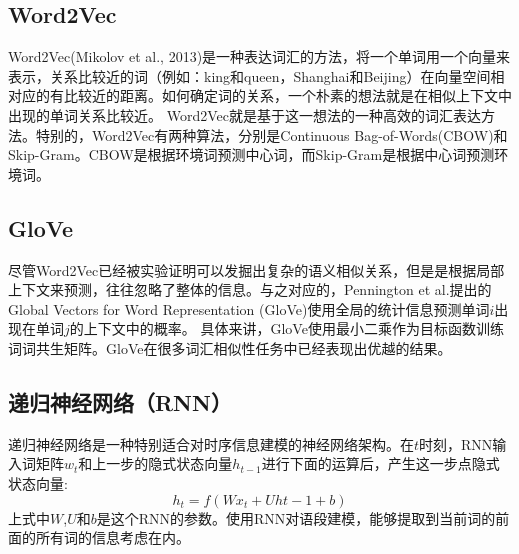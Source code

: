 \subsection{Word2Vec}
Word2Vec(Mikolov et al., 2013\cite{mikolov2013efficient})是一种表达词汇的方法，将一个单词用一个向量来表示，关系比较近的词（例如：king和queen，Shanghai和Beijing）在向量空间相对应的有比较近的距离。如何确定词的关系，一个朴素的想法就是在相似上下文中出现的单词关系比较近。
Word2Vec就是基于这一想法的一种高效的词汇表达方法。特别的，Word2Vec有两种算法，分别是Continuous Bag-of-Words(CBOW)和Skip-Gram。CBOW是根据环境词预测中心词，而Skip-Gram是根据中心词预测环境词。\\
\subsection{GloVe}
尽管Word2Vec已经被实验证明可以发掘出复杂的语义相似关系，但是是根据局部上下文来预测，往往忽略了整体的信息。与之对应的，Pennington et al.\cite{pennington2014glove}提出的Global Vectors for Word Representation (GloVe)使用全局的统计信息预测单词$i$出现在单词$j$的上下文中的概率。
具体来讲，GloVe使用最小二乘作为目标函数训练词词共生矩阵。GloVe在很多词汇相似性任务中已经表现出优越的结果。\\
\subsection{递归神经网络（RNN）}
递归神经网络是一种特别适合对时序信息建模的神经网络架构。在$t$时刻，RNN输入词矩阵$w_t$和上一步的隐式状态向量$h_{t-1}$进行下面的运算后，产生这一步点隐式状态向量:\\
\begin{equation}
h_t = f(Wx_t+Uh{t-1}+b)
\end{equation}
上式中$W$,$U$和$b$是这个RNN的参数。使用RNN对语段建模，能够提取到当前词的前面的所有词的信息考虑在内。
